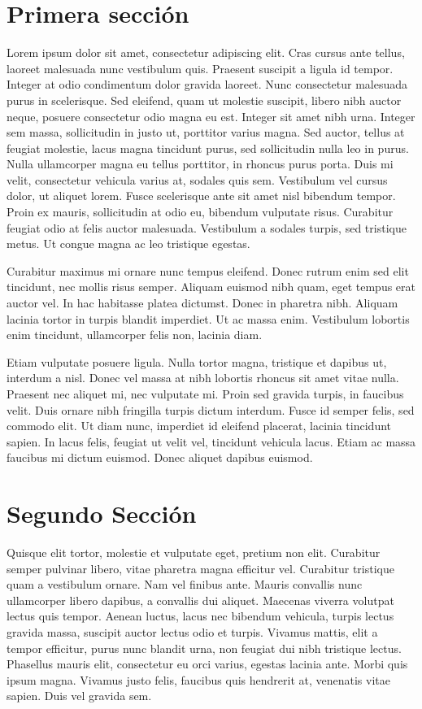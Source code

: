 \section{Primera sección}
Lorem ipsum dolor sit amet, consectetur adipiscing elit. Cras cursus ante tellus, laoreet malesuada nunc vestibulum quis. Praesent suscipit a ligula id tempor. Integer at odio condimentum dolor gravida laoreet. Nunc consectetur malesuada purus in scelerisque. Sed eleifend, quam ut molestie suscipit, libero nibh auctor neque, posuere consectetur odio magna eu est. Integer sit amet nibh urna. Integer sem massa, sollicitudin in justo ut, porttitor varius magna. Sed auctor, tellus at feugiat molestie, lacus magna tincidunt purus, sed sollicitudin nulla leo in purus. Nulla ullamcorper magna eu tellus porttitor, in rhoncus purus porta. Duis mi velit, consectetur vehicula varius at, sodales quis sem. Vestibulum vel cursus dolor, ut aliquet lorem. Fusce scelerisque ante sit amet nisl bibendum tempor. Proin ex mauris, sollicitudin at odio eu, bibendum vulputate risus. Curabitur feugiat odio at felis auctor malesuada. Vestibulum a sodales turpis, sed tristique metus. Ut congue magna ac leo tristique egestas.

Curabitur maximus mi ornare nunc tempus eleifend. Donec rutrum enim sed elit tincidunt, nec mollis risus semper. Aliquam euismod nibh quam, eget tempus erat auctor vel. In hac habitasse platea dictumst. Donec in pharetra nibh. Aliquam lacinia tortor in turpis blandit imperdiet. Ut ac massa enim. Vestibulum lobortis enim tincidunt, ullamcorper felis non, lacinia diam.

Etiam vulputate posuere ligula. Nulla tortor magna, tristique et dapibus ut, interdum a nisl. Donec vel massa at nibh lobortis rhoncus sit amet vitae nulla. Praesent nec aliquet mi, nec vulputate mi. Proin sed gravida turpis, in faucibus velit. Duis ornare nibh fringilla turpis dictum interdum. Fusce id semper felis, sed commodo elit. Ut diam nunc, imperdiet id eleifend placerat, lacinia tincidunt sapien. In lacus felis, feugiat ut velit vel, tincidunt vehicula lacus. Etiam ac massa faucibus mi dictum euismod. Donec aliquet dapibus euismod.

\section{Segundo Sección}
Quisque elit tortor, molestie et vulputate eget, pretium non elit. Curabitur semper pulvinar libero, vitae pharetra magna efficitur vel. Curabitur tristique quam a vestibulum ornare. Nam vel finibus ante. Mauris convallis nunc ullamcorper libero dapibus, a convallis dui aliquet. Maecenas viverra volutpat lectus quis tempor. Aenean luctus, lacus nec bibendum vehicula, turpis lectus gravida massa, suscipit auctor lectus odio et turpis. Vivamus mattis, elit a tempor efficitur, purus nunc blandit urna, non feugiat dui nibh tristique lectus. Phasellus mauris elit, consectetur eu orci varius, egestas lacinia ante. Morbi quis ipsum magna. Vivamus justo felis, faucibus quis hendrerit at, venenatis vitae sapien. Duis vel gravida sem.

